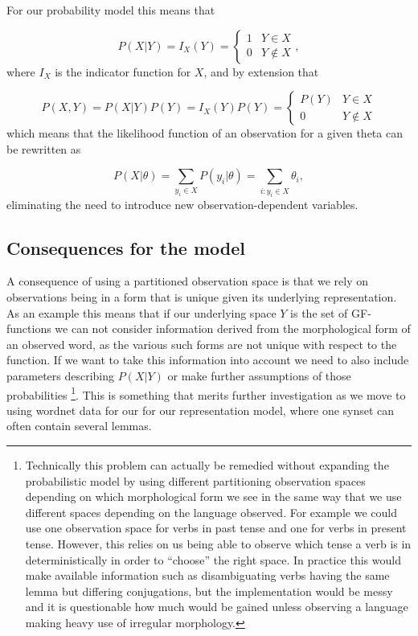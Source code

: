 For our probability model this means that 

\begin{equation*}
P(X | Y) = I_X(Y) =\begin{cases} 
      1 & Y\in X \\
      0 & Y\not\in X 
   \end{cases},
\end{equation*}
where $I_X$ is the indicator function for $X$, and by extension that

\begin{equation*}
P(X, Y) = P(X | Y)P(Y)=I_X(Y)P(Y)=\begin{cases} 
      P(Y) & Y\in X \\
      0 & Y\not\in X 
   \end{cases}
\end{equation*}
which means that the likelihood function of an observation for a given theta can be rewritten as 

\begin{equation*}
P(X | \theta) = \sum_{y_i\in X}P(y_i | \theta)=\sum_{i: y_i\in X}\theta_i,
\end{equation*}
eliminating the need to introduce new observation-dependent variables.

\subsection{Consequences for the model}
A consequence of using a partitioned observation space is that we rely on observations being in a form that is unique given its underlying representation. As an example this means that if our underlying space $Y$ is the set of GF-functions we can not consider information derived from the morphological form of an observed word, as the various such forms are not unique with respect to the function. If we want to take this information into account we need to also include parameters describing $P(X|Y)$ or make further assumptions of those probabilities \footnote{Technically this problem can actually be remedied without expanding the probabilistic model by using different partitioning observation spaces depending on which morphological form we see in the same way that we use different spaces depending on the language observed. For example we could use one observation space for verbs in past tense and one for verbs in present tense. However, this relies on us being able to observe which tense a verb is in deterministically in order to ``choose'' the right space. In practice this would make available information such as disambiguating verbs having the same lemma but differing conjugations, but the implementation would be messy and it is questionable how much would be gained unless observing a language making heavy use of irregular morphology.}. This is something that merits further investigation as we move to using wordnet data for our for our representation model, where one synset can often contain several lemmas. 

